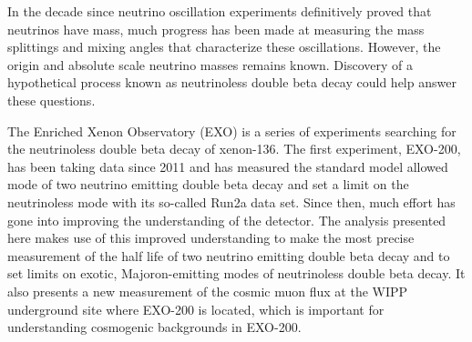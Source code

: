 In the decade since neutrino oscillation experiments definitively proved that neutrinos have mass, much progress has been made at measuring the mass splittings and mixing angles that characterize these oscillations. However, the origin and absolute scale neutrino masses remains known. Discovery of a hypothetical process known as neutrinoless double beta decay could help answer these questions.

The Enriched Xenon Observatory (EXO) is a series of experiments searching for the neutrinoless double beta decay of xenon-136. The first experiment, EXO-200, has been taking data since 2011 and has measured the standard model allowed mode of two neutrino emitting double beta decay and set a limit on the neutrinoless mode with its so-called Run2a data set. Since then, much effort has gone into improving the understanding of the detector. The analysis presented here makes use of this improved understanding to make the most precise measurement of the half life of two neutrino emitting double beta decay and to set limits on exotic, Majoron-emitting modes of neutrinoless double beta decay. It also presents a new measurement of the cosmic muon flux at the WIPP underground site where EXO-200 is located, which is important for understanding cosmogenic backgrounds in EXO-200.
